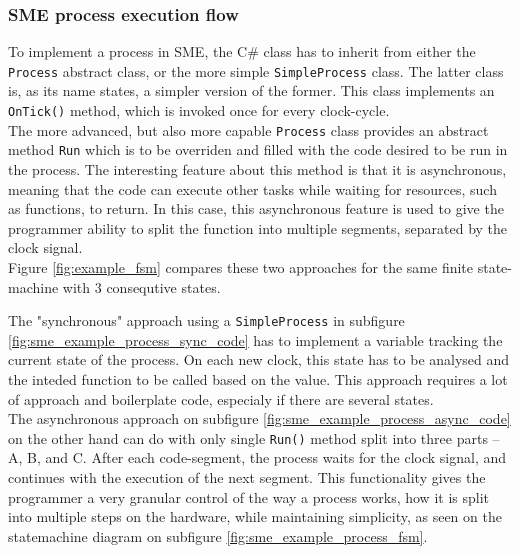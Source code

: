 \subsubsection{SME process execution flow}
To implement a process in SME, the C\# class has to inherit from
either the \texttt{Process} abstract class, or the more simple
\texttt{SimpleProcess} class.
The latter class is, as its name states, a simpler version of the former. This
class implements an \texttt{OnTick()} method, which is invoked once for every
clock-cycle.\\
The more advanced, but also more capable \texttt{Process}
class provides
an abstract method \texttt{Run} which is to be overriden and filled
with the code desired to be run in the process. The interesting feature
about this method is that it is asynchronous, meaning that the code can
execute other tasks while waiting for resources, such as functions,
to return. In this case, this asynchronous feature is used to give
the programmer ability to split the function into multiple segments,
separated by the clock signal.\\
Figure \ref{fig:example_fsm} compares these two approaches for the same
finite state-machine with 3 consequtive states.

The "synchronous" approach using a \texttt{SimpleProcess} in subfigure
\ref{fig:sme_example_process_sync_code} has to implement a
variable tracking the current state of the process. On each new clock, this
state has to be analysed and the inteded function to be called based on the
value. This approach requires a lot of approach and boilerplate code, especialy
if there are several states.\\
The asynchronous approach on subfigure
\ref{fig:sme_example_process_async_code} on the other hand can do with only
single \texttt{Run()} method split into three parts -- A, B, and C.
After each code-segment, the process waits for the clock signal, and
continues with the execution of the next segment.  This functionality
gives the programmer a very granular control of the way a process
works, how it is split into multiple steps on the hardware, while
maintaining simplicity, as seen on the statemachine diagram on subfigure
\ref{fig:sme_example_process_fsm}.

